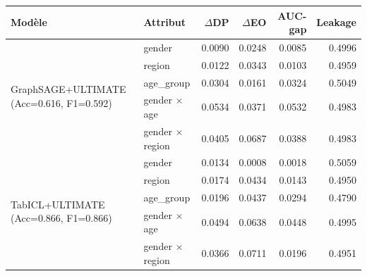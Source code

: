 \documentclass[10pt,a4paper]{article}
\begin{document}
\begin{center}\footnotesize
\begin{tabular}{l l r r r r}
\toprule
\textbf{Modèle} & \textbf{Attribut} & \textbf{$\Delta$DP} & \textbf{$\Delta$EO} & \textbf{AUC-gap} & \textbf{Leakage} \\
\midrule
\multirow{5}{*}{GraphSAGE+ULTIMATE (Acc=0.616, F1=0.592)} & gender & 0.0090 & 0.0248 & 0.0085 & 0.4996 \\
 & region & 0.0122 & 0.0343 & 0.0103 & 0.4959 \\
 & age\_group & 0.0304 & 0.0161 & 0.0324 & 0.5049 \\
 & gender $\times$ age & 0.0534 & 0.0371 & 0.0532 & 0.4983 \\
 & gender $\times$ region & 0.0405 & 0.0687 & 0.0388 & 0.4983 \\
\midrule
\multirow{5}{*}{TabICL+ULTIMATE (Acc=0.866, F1=0.866)} & gender & 0.0134 & 0.0008 & 0.0018 & 0.5059 \\
 & region & 0.0174 & 0.0434 & 0.0143 & 0.4950 \\
 & age\_group & 0.0196 & 0.0437 & 0.0294 & 0.4790 \\
 & gender $\times$ age & 0.0494 & 0.0638 & 0.0448 & 0.4995 \\
 & gender $\times$ region & 0.0366 & 0.0711 & 0.0196 & 0.4951 \\
\bottomrule
\end{tabular}
\end{center}
\end{document}
